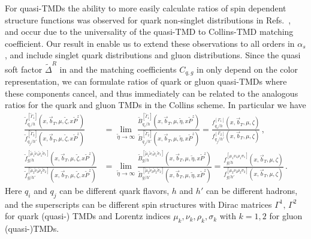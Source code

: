 \documentclass[11pt,a4paper]{article}
\newcommand{\nn}{\nonumber}
\newcommand{\bt}{\vec b_T}
\begin{document}
For quasi-TMDs the ability to more easily calculate ratios of spin dependent structure functions was observed for quark non-singlet distributions in Refs.~\cite{Ebert:2020gxr,Ji:2020jeb}, and occur due to the universality of the quasi-TMD to Collins-TMD matching coefficient. Our result in  enable us to extend these observations to all orders in $\alpha_s$, and include singlet quark distributions and gluon distributions. 
Since  the quasi soft factor $\tilde \Delta^R$ in  and the matching coefficients $C_{q,g}$ in  only depend on the color representation, we can formulate ratios of quark or gluon quasi-TMDs where these components cancel, and thus immediately can be related to the analogous ratios for the quark and gluon TMDs in the Collins scheme. In particular we have
\begin{align}  \label{eq:quasiratios} 
 \frac{\tilde f_{q_i/h}^{[\tilde \Gamma_1]}(x, \bt, \mu, \tilde \zeta, x\tilde P^z)}
      {\tilde f_{q_j/h'}^{[\tilde \Gamma_2]}(x, \bt, \mu, \tilde \zeta, x \tilde P^z)}
& =\lim_{\tilde \eta\to\infty}
 \frac{\tilde B_{q_i/h}^{[\tilde \Gamma_1]}(x,\vec{b}_T,\mu,\tilde \eta, x \tilde P^z)}
      { \tilde B_{q_j/h'}^{[\tilde \Gamma_2]}(x,\vec{b}_T,\mu,\tilde \eta, x \tilde P^z)}
 =   \frac{ f_{q_i/h}^{[\Gamma_1]}(x, \bt, \mu, \zeta)}
      { f_{q_j/h'}^{[ \Gamma_2]}(x, \bt, \mu, \zeta)}
\,,\\
 \frac{\tilde f_{g/h}^{[\tilde \mu_1 \tilde \nu_1 \tilde \rho_1 \tilde \sigma_1]}(x, \bt, \mu, \tilde \zeta, x\tilde P^z)}
      {\tilde f_{g/h'}^{[\tilde \mu_2 \tilde \nu_2 \tilde \rho_2 \tilde \sigma_2]}(x, \bt, \mu, \tilde \zeta, x \tilde P^z)}
 &=\lim_{\tilde \eta\to\infty}
 \frac{\tilde B_{g/h}^{[\tilde \mu_1 \tilde \nu_1 \tilde \rho_1 \tilde \sigma_1]}(x,\vec{b}_T,\mu,\tilde \eta, x \tilde P^z)}
      { \tilde B_{g/h'}^{[\tilde \mu_2 \tilde \nu_2 \tilde \rho_2 \tilde \sigma_2]}(x,\vec{b}_T,\mu,\tilde \eta, x \tilde P^z)}
 =   \frac{ f_{g/h}^{[\mu_1\nu_1\rho_1\sigma_1]}(x, \bt, \mu, \zeta)}
      { f_{g/h'}^{[ \mu_2  \nu_2 \rho_2 \sigma_2]}(x, \bt, \mu, \zeta)}
\,.\nn
\end{align}
Here $q_i$ and $q_j$ can be different quark flavors, $h$ and $h'$ can be different hadrons, and the superscripts can be different spin structures with Dirac matrices $\Gamma^1,\,\Gamma^2$ for quark (quasi-) TMDs and Lorentz indices $\mu_k,\nu_k,\rho_k,\sigma_k$ with $k=1,2$ for gluon (quasi-)TMDs.
\end{document}
